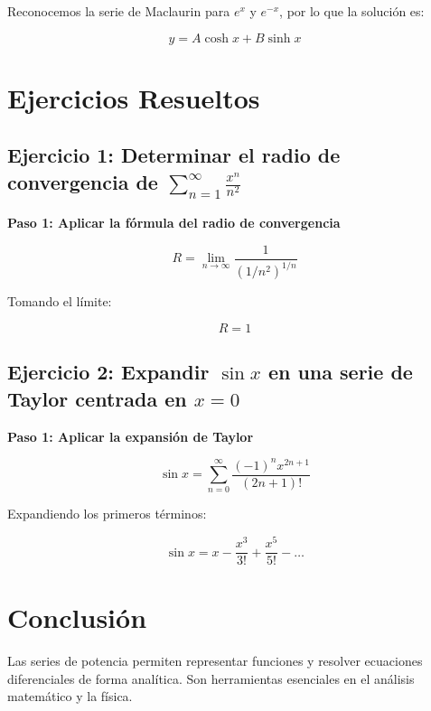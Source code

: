 Reconocemos la serie de Maclaurin para \( e^x \) y \( e^{-x} \), por lo que la solución es:

\begin{equation}
y = A \cosh x + B \sinh x
\end{equation}

\section{Ejercicios Resueltos}
\subsection*{Ejercicio 1: Determinar el radio de convergencia de \( \sum_{n=1}^{\infty} \frac{x^n}{n^2} \)}
\textbf{Paso 1: Aplicar la fórmula del radio de convergencia}

\begin{equation}
R = \lim_{n \to \infty} \frac{1}{(1/n^2)^{1/n}}
\end{equation}

Tomando el límite:

\begin{equation}
R = 1
\end{equation}

\subsection*{Ejercicio 2: Expandir \( \sin x \) en una serie de Taylor centrada en \( x = 0 \)}
\textbf{Paso 1: Aplicar la expansión de Taylor}

\begin{equation}
\sin x = \sum_{n=0}^{\infty} \frac{(-1)^n x^{2n+1}}{(2n+1)!}
\end{equation}

Expandiendo los primeros términos:

\begin{equation}
\sin x = x - \frac{x^3}{3!} + \frac{x^5}{5!} - \dots
\end{equation}

\section{Conclusión}
Las series de potencia permiten representar funciones y resolver ecuaciones diferenciales de forma analítica. Son herramientas esenciales en el análisis matemático y la física.

